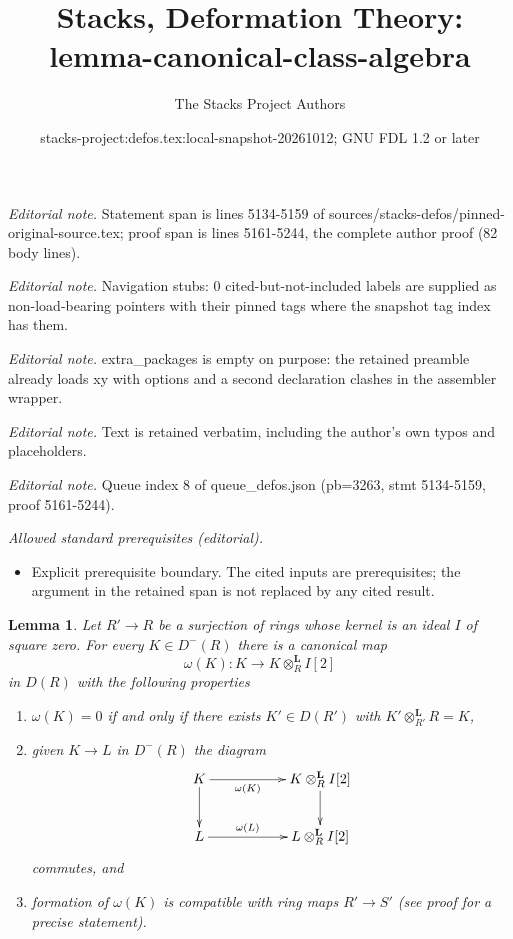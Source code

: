 \documentclass[10pt,a4paper]{amsart}
\title{Stacks, Deformation Theory: lemma-canonical-class-algebra}
\author{The Stacks Project Authors}
\date{stacks-project:defos.tex:local-snapshot-20261012; GNU FDL 1.2 or later}
\theoremstyle{plain}
\newtheorem{lemma}[subsection]{Lemma}
\theoremstyle{definition}
\theoremstyle{remark}
\numberwithin{equation}{subsection}
\begin{document}
\maketitle
\noindent\textit{Editorial note.} Statement span is lines 5134-5159 of sources/stacks-defos/pinned-original-source.tex; proof span is lines 5161-5244, the complete author proof (82 body lines).\par\medskip
\noindent\textit{Editorial note.} Navigation stubs: 0 cited-but-not-included labels are supplied as non-load-bearing pointers with their pinned tags where the snapshot tag index has them.\par\medskip
\noindent\textit{Editorial note.} extra\_packages is empty on purpose: the retained preamble already loads xy with options and a second declaration clashes in the assembler wrapper.\par\medskip
\noindent\textit{Editorial note.} Text is retained verbatim, including the author's own typos and placeholders.\par\medskip
\noindent\textit{Editorial note.} Queue index 8 of queue\_defos.json (pb=3263, stmt 5134-5159, proof 5161-5244).\par\medskip
\noindent\textit{Allowed standard prerequisites (editorial).}\begin{itemize}
\item Explicit prerequisite boundary. The cited inputs are prerequisites; the argument in the retained span is not replaced by any cited result.
\end{itemize}\medskip
\begin{lemma}
\label{lemma-canonical-class-algebra}
Let $R' \to R$ be a surjection of rings whose kernel is an ideal
$I$ of square zero. For every $K \in D^-(R)$ there is a canonical
map
$$
\omega(K) : K \longrightarrow K \otimes_R^\mathbf{L} I[2]
$$
in $D(R)$ with the following properties
\begin{enumerate}
\item $\omega(K) = 0$ if and only if there exists
$K' \in D(R')$ with $K' \otimes_{R'}^\mathbf{L} R = K$,
\item given $K \to L$ in $D^-(R)$ the diagram
$$
\xymatrix{
K \ar[d] \ar[rr]_-{\omega(K)} & &
K \otimes^\mathbf{L}_R I[2] \ar[d] \\
L \ar[rr]^-{\omega(L)} & &
L \otimes^\mathbf{L}_R I[2]
}
$$
commutes, and
\item formation of $\omega(K)$ is compatible with ring maps $R' \to S'$
(see proof for a precise statement).
\end{enumerate}
\end{lemma}
\end{document}
